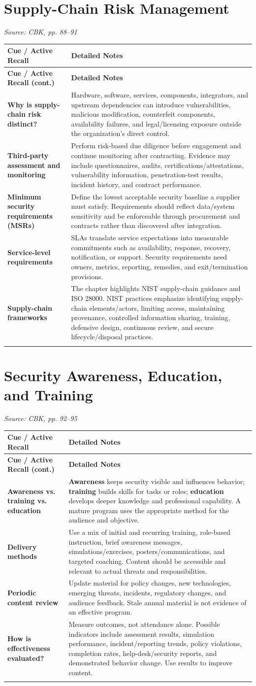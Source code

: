 \documentclass[10pt,letterpaper]{article}
\makeatletter
\newenvironment{cornell}
{\rowcolors{2}{white}{notebg}\begin{longtable}{@{}>{\raggedright\arraybackslash\columncolor{cuebg}\color{navy}\bfseries}p{0.285\textwidth}>{\raggedright\arraybackslash}p{0.65\textwidth}@{}}
\rowcolor{navy}\color{white}\textbf{Cue / Active Recall} & \color{white}\textbf{Detailed Notes}\\ \hline
\endfirsthead
\rowcolor{navy}\color{white}\textbf{Cue / Active Recall (cont.)} & \color{white}\textbf{Detailed Notes}\\ \hline
\endhead}
{\end{longtable}}
\newcommand{\noterow}[2]{#1 & #2\\\arrayrulecolor{line}\hline}
\newcommand{\source}[1]{\par{\footnotesize\color{teal}\textit{Source: CBK, #1}}\par}
\makeatother
\begin{document}
\section{\color{navy}Supply-Chain Risk Management}
\source{pp. 88--91}
\begin{cornell}
\noterow{Why is supply-chain risk distinct?}{Hardware, software, services, components, integrators, and upstream dependencies can introduce vulnerabilities, malicious modification, counterfeit components, availability failures, and legal/licensing exposure outside the organization's direct control.}
\noterow{Third-party assessment and monitoring}{Perform risk-based due diligence before engagement and continue monitoring after contracting. Evidence may include questionnaires, audits, certifications/attestations, vulnerability information, penetration-test results, incident history, and contract performance.}
\noterow{Minimum security requirements (MSRs)}{Define the lowest acceptable security baseline a supplier must satisfy. Requirements should reflect data/system sensitivity and be enforceable through procurement and contracts rather than discovered after integration.}
\noterow{Service-level requirements}{SLAs translate service expectations into measurable commitments such as availability, response, recovery, notification, or support. Security requirements need owners, metrics, reporting, remedies, and exit/termination provisions.}
\noterow{Supply-chain frameworks}{The chapter highlights NIST supply-chain guidance and ISO 28000. NIST practices emphasize identifying supply-chain elements/actors, limiting access, maintaining provenance, controlled information sharing, training, defensive design, continuous review, and secure lifecycle/disposal practices.}
\end{cornell}

\section{\color{navy}Security Awareness, Education, and Training}
\source{pp. 92--95}
\begin{cornell}
\noterow{Awareness vs. training vs. education}{\textbf{Awareness} keeps security visible and influences behavior; \textbf{training} builds skills for tasks or roles; \textbf{education} develops deeper knowledge and professional capability. A mature program uses the appropriate method for the audience and objective.}
\noterow{Delivery methods}{Use a mix of initial and recurring training, role-based instruction, brief awareness messages, simulations/exercises, posters/communications, and targeted coaching. Content should be accessible and relevant to actual threats and responsibilities.}
\noterow{Periodic content review}{Update material for policy changes, new technologies, emerging threats, incidents, regulatory changes, and audience feedback. Stale annual material is not evidence of an effective program.}
\noterow{How is effectiveness evaluated?}{Measure outcomes, not attendance alone. Possible indicators include assessment results, simulation performance, incident/reporting trends, policy violations, completion rates, help-desk/security reports, and demonstrated behavior change. Use results to improve content.}
\end{cornell}
\end{document}
